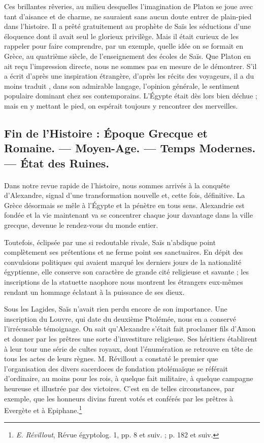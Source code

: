 \documentclass[a4paper, 11pt, oneside]{article}
\begin{document}
Ces brillantes rêveries, au milieu desquelles l'imagination de Platon se joue avec tant d'aisance et de charme, ne sauraient sans aucun doute entrer de plain-pied dans l'histoire. Il a prêté gratuitement au prophète de Saïs les séductions d'une éloquence dont il avait seul le glorieux privilège. Mais il était curieux de les rappeler pour faire comprendre, par un exemple, quelle idée on se formait en Grèce, au quatrième siècle, de l'enseignement des écoles de Saïs. Que Platon en ait reçu l'impression directe, nous ne sommes pas en mesure de le démontrer. S'il a écrit d'après une inspiration étrangère, d'après les récits des voyageurs, il a du moins traduit , dans son admirable langage, l'opinion générale, le sentiment populaire dominant chez ses contemporains. L'Égypte était dès lors bien déchue ; mais en y mettant le pied, on espérait toujours y rencontrer des merveilles.
\clearpage
\subsection{Fin de l'Histoire : Époque Grecque et Romaine. --- Moyen-Age. --- Temps Modernes. --- État des Ruines.}
\paragraph{}
Dans notre revue rapide de l'histoire, nous sommes arrivés à la conquête d'Alexandre, signal d'une transformation nouvelle et, cette fois, définitive. La Grèce désormais se mêle à l'Égypte et la pénètre en tous sens. Alexandrie est fondée et la vie maintenant va se concentrer chaque jour davantage dans la ville grecque, devenue le rendez-vous du monde entier.

Toutefois, éclipsée par une si redoutable rivale, Saïs n'abdique point complètement ses prétentions et ne ferme point ses sanctuaires. En dépit des convulsions politiques qui avaient marqué les derniers jours de la nationalité égyptienne, elle conserve son caractère de grande cité religieuse et savante ; les inscriptions de la statuette naophore nous montrent les étrangers eux-mêmes rendant un hommage éclatant à la puissance de ses dieux.

Sous les Lagides, Saïs n'avait rien perdu encore de son importance. Une inscription du Louvre, qui date du deuxième Ptolémée, nous en a conservé l'irrécusable témoignage. On sait qu'Alexandre s'était fait proclamer fils d'Amon et donner par les prêtres une sorte d'investiture religieuse. Ses héritiers établirent à leur tour une série de cultes royaux, dont l'énumération se retrouve en tête de tous les actes de leurs règnes. M. Révillout a constaté le premier que l'organisation des divers sacerdoces de fondation ptolémaïque se référait d'ordinaire, au moins pour les rois, à quelque fait militaire, à quelque campagne heureuse et illustrée par des victoires. C'est en de telles circonstances, par exemple, que les honneurs divins furent votés et conférés par les prêtres à Evergète et à Epiphane.\footnote{\emph{E. Révillout}, Révue égyptolog. 1, pp. 8 et suiv. ; p. 182 et suiv.}
\end{document}
